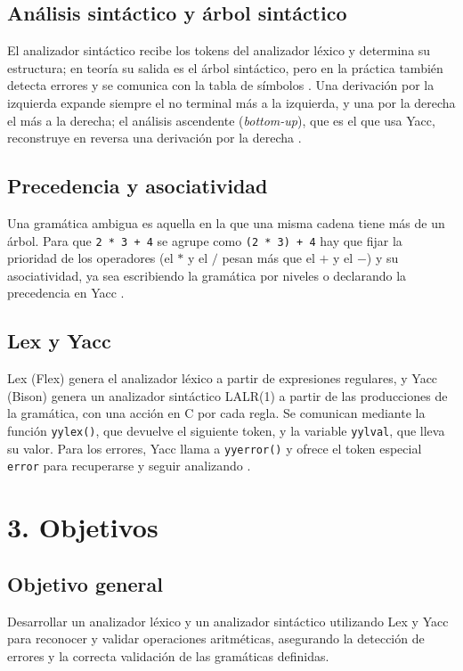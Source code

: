 \documentclass{article}
\begin{document}
    \subsection{Análisis sintáctico y árbol sintáctico}
    El analizador sintáctico recibe los tokens del analizador léxico y determina su estructura; en teoría su salida es el árbol sintáctico, pero en la práctica también detecta errores y se comunica con la tabla de símbolos \cite{Aho2007}. Una derivación por la izquierda expande siempre el no terminal más a la izquierda, y una por la derecha el más a la derecha; el análisis ascendente (\emph{bottom-up}), que es el que usa Yacc, reconstruye en reversa una derivación por la derecha \cite{Aho2007}.

    \subsection{Precedencia y asociatividad}
    Una gramática ambigua es aquella en la que una misma cadena tiene más de un árbol. Para que \texttt{2 * 3 + 4} se agrupe como \texttt{(2 * 3) + 4} hay que fijar la prioridad de los operadores (el $*$ y el $/$ pesan más que el $+$ y el $-$) y su asociatividad, ya sea escribiendo la gramática por niveles o declarando la precedencia en Yacc \cite{Levine2009}.

    \subsection{Lex y Yacc}
    Lex (Flex) genera el analizador léxico a partir de expresiones regulares, y Yacc (Bison) genera un analizador sintáctico LALR(1) a partir de las producciones de la gramática, con una acción en C por cada regla. Se comunican mediante la función \texttt{yylex()}, que devuelve el siguiente token, y la variable \texttt{yylval}, que lleva su valor. Para los errores, Yacc llama a \texttt{yyerror()} y ofrece el token especial \texttt{error} para recuperarse y seguir analizando \cite{Levine2009}.
    \newpage

\section{3. Objetivos}
    \subsection{Objetivo general}
    Desarrollar un analizador léxico y un analizador sintáctico utilizando Lex y Yacc para reconocer y validar operaciones aritméticas, asegurando la detección de errores y la correcta validación de las gramáticas definidas.
\end{document}
